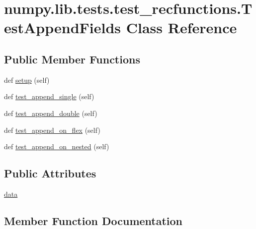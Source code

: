 \hypertarget{classnumpy_1_1lib_1_1tests_1_1test__recfunctions_1_1TestAppendFields}{}\section{numpy.\+lib.\+tests.\+test\+\_\+recfunctions.\+Test\+Append\+Fields Class Reference}
\label{classnumpy_1_1lib_1_1tests_1_1test__recfunctions_1_1TestAppendFields}
\subsection*{Public Member Functions}
\begin{DoxyCompactItemize}
\item 
def \hyperlink{classnumpy_1_1lib_1_1tests_1_1test__recfunctions_1_1TestAppendFields_a91be58ab60fb2b1d6ceee213c16643a2}{setup} (self)
\item 
def \hyperlink{classnumpy_1_1lib_1_1tests_1_1test__recfunctions_1_1TestAppendFields_a464c02d232b2c8ca958dbbc95260eff0}{test\+\_\+append\+\_\+single} (self)
\item 
def \hyperlink{classnumpy_1_1lib_1_1tests_1_1test__recfunctions_1_1TestAppendFields_a618dbbbeebd88609f4e7b22f6fefe5b8}{test\+\_\+append\+\_\+double} (self)
\item 
def \hyperlink{classnumpy_1_1lib_1_1tests_1_1test__recfunctions_1_1TestAppendFields_a276f64936a11973807f5ef224c681723}{test\+\_\+append\+\_\+on\+\_\+flex} (self)
\item 
def \hyperlink{classnumpy_1_1lib_1_1tests_1_1test__recfunctions_1_1TestAppendFields_a9db74325c726fc76655d31670c833a51}{test\+\_\+append\+\_\+on\+\_\+nested} (self)
\end{DoxyCompactItemize}
\subsection*{Public Attributes}
\begin{DoxyCompactItemize}
\item 
\hyperlink{classnumpy_1_1lib_1_1tests_1_1test__recfunctions_1_1TestAppendFields_a2aff68da3a45344ceb82631bea7f6496}{data}
\end{DoxyCompactItemize}


\subsection{Member Function Documentation}
\mbox{\label{classnumpy_1_1lib_1_1tests_1_1test__recfunctions_1_1TestAppendFields_a91be58ab60fb2b1d6ceee213c16643a2}} 
